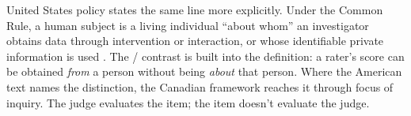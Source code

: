 United States policy states the same line more explicitly. Under the Common Rule, a human subject is a living individual \enquote{about whom} an investigator obtains data through intervention or interaction, or whose identifiable private information is used \citep{commonrule2018}. The / contrast is built into the definition: a rater's score can be obtained \emph{from} a person without being \emph{about} that person. Where the American text names the distinction, the Canadian framework reaches it through focus of inquiry. The judge evaluates the item; the item doesn't evaluate the judge.
